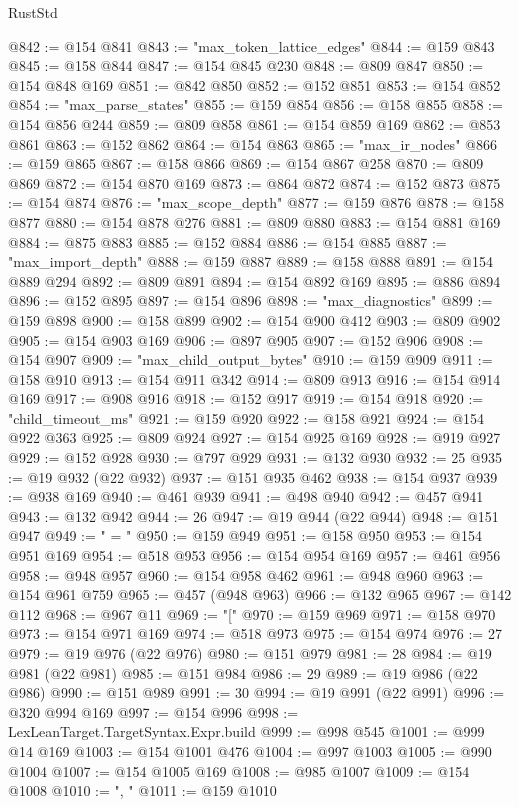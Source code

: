 \begin{lexlean}{RustStd}
\begin{coremodule}
@842 := @154 @841
@843 := "max_token_lattice_edges"
@844 := @159 @843
@845 := @158 @844
@847 := @154 @845 @230
@848 := @809 @847
@850 := @154 @848 @169
@851 := @842 @850
@852 := @152 @851
@853 := @154 @852
@854 := "max_parse_states"
@855 := @159 @854
@856 := @158 @855
@858 := @154 @856 @244
@859 := @809 @858
@861 := @154 @859 @169
@862 := @853 @861
@863 := @152 @862
@864 := @154 @863
@865 := "max_ir_nodes"
@866 := @159 @865
@867 := @158 @866
@869 := @154 @867 @258
@870 := @809 @869
@872 := @154 @870 @169
@873 := @864 @872
@874 := @152 @873
@875 := @154 @874
@876 := "max_scope_depth"
@877 := @159 @876
@878 := @158 @877
@880 := @154 @878 @276
@881 := @809 @880
@883 := @154 @881 @169
@884 := @875 @883
@885 := @152 @884
@886 := @154 @885
@887 := "max_import_depth"
@888 := @159 @887
@889 := @158 @888
@891 := @154 @889 @294
@892 := @809 @891
@894 := @154 @892 @169
@895 := @886 @894
@896 := @152 @895
@897 := @154 @896
@898 := "max_diagnostics"
@899 := @159 @898
@900 := @158 @899
@902 := @154 @900 @412
@903 := @809 @902
@905 := @154 @903 @169
@906 := @897 @905
@907 := @152 @906
@908 := @154 @907
@909 := "max_child_output_bytes"
@910 := @159 @909
@911 := @158 @910
@913 := @154 @911 @342
@914 := @809 @913
@916 := @154 @914 @169
@917 := @908 @916
@918 := @152 @917
@919 := @154 @918
@920 := "child_timeout_ms"
@921 := @159 @920
@922 := @158 @921
@924 := @154 @922 @363
@925 := @809 @924
@927 := @154 @925 @169
@928 := @919 @927
@929 := @152 @928
@930 := @797 @929
@931 := @132 @930
@932 := 25
@935 := @19 @932 (@22 @932)
@937 := @151 @935 @462
@938 := @154 @937
@939 := @938 @169
@940 := @461 @939
@941 := @498 @940
@942 := @457 @941
@943 := @132 @942
@944 := 26
@947 := @19 @944 (@22 @944)
@948 := @151 @947
@949 := " = "
@950 := @159 @949
@951 := @158 @950
@953 := @154 @951 @169
@954 := @518 @953
@956 := @154 @954 @169
@957 := @461 @956
@958 := @948 @957
@960 := @154 @958 @462
@961 := @948 @960
@963 := @154 @961 @759
@965 := @457 (@948 @963)
@966 := @132 @965
@967 := @142 @112
@968 := @967 @11
@969 := "["
@970 := @159 @969
@971 := @158 @970
@973 := @154 @971 @169
@974 := @518 @973
@975 := @154 @974
@976 := 27
@979 := @19 @976 (@22 @976)
@980 := @151 @979
@981 := 28
@984 := @19 @981 (@22 @981)
@985 := @151 @984
@986 := 29
@989 := @19 @986 (@22 @986)
@990 := @151 @989
@991 := 30
@994 := @19 @991 (@22 @991)
@996 := @320 @994 @169
@997 := @154 @996
@998 := LexLeanTarget.TargetSyntax.Expr.build
@999 := @998 @545
@1001 := @999 @14 @169
@1003 := @154 @1001 @476
@1004 := @997 @1003
@1005 := @990 @1004
@1007 := @154 @1005 @169
@1008 := @985 @1007
@1009 := @154 @1008
@1010 := ", "
@1011 := @159 @1010

\end{coremodule}
\end{lexlean}
